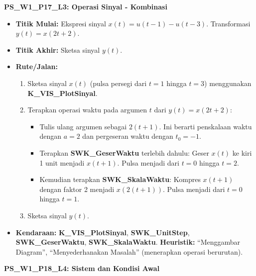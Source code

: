 \documentclass[
  letterpaper,
  DIV=11,
  numbers=noendperiod]{scrreprt}
\providecommand{\tightlist}{%
  \setlength{\itemsep}{0pt}\setlength{\parskip}{0pt}}\usepackage{longtable,booktabs,array}
\begin{document}
\textbf{PS\_W1\_P17\_L3: Operasi Sinyal - Kombinasi}

\begin{itemize}
\tightlist
\item
  \textbf{Titik Mulai:} Ekspresi sinyal \(x(t) = u(t-1) - u(t-3)\).
  Transformasi \(y(t) = x(2t+2)\).
\item
  \textbf{Titik Akhir:} Sketsa sinyal \(y(t)\).
\item
  \textbf{Rute/Jalan:}

  \begin{enumerate}
  \def\labelenumi{\arabic{enumi}.}
  \tightlist
  \item
    Sketsa sinyal \(x(t)\) (pulsa persegi dari \(t=1\) hingga \(t=3\))
    menggunakan \textbf{K\_VIS\_PlotSinyal}.
  \item
    Terapkan operasi waktu pada argumen \(t\) dari \(y(t) = x(2t+2)\):

    \begin{itemize}
    \tightlist
    \item
      Tulis ulang argumen sebagai \(2(t+1)\). Ini berarti penskalaan
      waktu dengan \(a=2\) dan pergeseran waktu dengan \(t_0=-1\).
    \item
      Terapkan \textbf{SWK\_GeserWaktu} terlebih dahulu: Geser \(x(t)\)
      ke kiri 1 unit menjadi \(x(t+1)\). Pulsa menjadi dari \(t=0\)
      hingga \(t=2\).
    \item
      Kemudian terapkan \textbf{SWK\_SkalaWaktu}: Kompres \(x(t+1)\)
      dengan faktor 2 menjadi \(x(2(t+1))\). Pulsa menjadi dari \(t=0\)
      hingga \(t=1\).
    \end{itemize}
  \item
    Sketsa sinyal \(y(t)\).
  \end{enumerate}
\item
  \textbf{Kendaraan:} \textbf{K\_VIS\_PlotSinyal},
  \textbf{SWK\_UnitStep}, \textbf{SWK\_GeserWaktu},
  \textbf{SWK\_SkalaWaktu}. \textbf{Heuristik:} ``Menggambar Diagram'',
  ``Menyederhanakan Masalah'' (menerapkan operasi berurutan).
\end{itemize}

\textbf{PS\_W1\_P18\_L4: Sistem dan Kondisi Awal}
\end{document}
